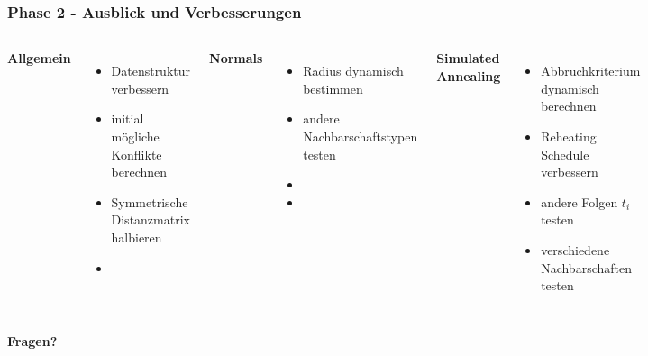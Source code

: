 \documentclass[aspectratio=169]{beamer}
\begin{document}



\begin{frame}
	\frametitle{Phase 2 - Ausblick und Verbesserungen}
	\begin{columns}[c] %
		
		\textbf{Allgemein}
		\begin{itemize}
			\item Datenstruktur verbessern
			\item initial mögliche Konflikte berechnen
			\item Symmetrische Distanzmatrix halbieren
			\item []
			
		\end{itemize}
		
		\textbf{Normals}
		\begin{itemize}
			\item Radius dynamisch bestimmen
			\item andere Nachbarschaftstypen testen
			\item []
			\item []
			
		\end{itemize}
		
	
		\textbf{Simulated Annealing}
		\begin{itemize}
			\item Abbruchkriterium dynamisch berechnen
			\item Reheating Schedule verbessern
			\item andere Folgen $t_{i}$ testen
			\item verschiedene Nachbarschaften testen
		\end{itemize}\pause
	
	\end{columns}
	\centering \textbf{Fragen?}
	\end{frame}
	
\end{document}
